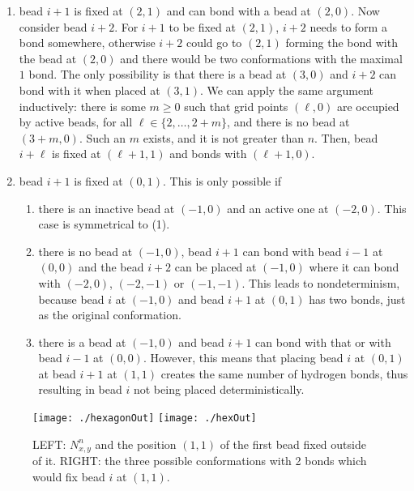 \documentclass[]{llncs}
\begin{document}
\begin{enumerate}
\item bead $i+1$ is fixed at $(2,1)$ and can bond with a bead at $(2,0)$. Now consider bead $i+2$. For $i+1$ to be fixed at $(2,1)$, $i+2$ needs to form a bond somewhere, otherwise $i+2$ could go to $(2,1)$ forming the bond with the bead at $(2,0)$ and there would be two conformations with the maximal $1$ bond. The only possibility is that there is a bead at $(3,0)$ and $i+2$ can bond with it when placed at $(3,1)$. We can apply the same argument inductively: there is some $m\geq 0$ such that grid points $(\ell,0)$ are occupied by active beads, for all $\ell\in \{2,\dots,2+m\}$, and there is no bead at $(3+m,0)$. Such an $m$ exists, and it is not greater than $n$. Then, bead $i+\ell$ is fixed at $(\ell+1,1)$ and bonds with $(\ell+1,0)$. 
\item bead $i+1$ is fixed at $(0,1)$. This is only possible if
\begin{enumerate}
\item there is an inactive bead at $(-1,0)$ and an active one at $(-2,0)$. This case is symmetrical to (1).
\item there is no bead at $(-1,0)$, bead $i+1$ can bond with bead $i-1$ at $(0,0)$ and the bead $i+2$ can be placed at $(-1,0)$ where it can bond with $(-2,0)$, $(-2,-1)$ or $(-1,-1)$. This leads to nondeterminism, because bead $i$ at $(-1,0)$ and bead $i+1$ at $(0,1)$ has two bonds, just as the original conformation.
\item there is a bead at $(-1,0)$ and bead $i+1$ can bond with that or with bead $i-1$ at $(0,0)$. However, this means that placing bead $i$ at $(0,1)$ at bead $i+1$ at $(1,1)$ creates the same number of hydrogen bonds, thus resulting in bead $i$ not being placed deterministically.

\end{enumerate}
\end{enumerate}




\begin{figure}
\centering
\texttt{[image: ./hexagonOut]}
\hspace{10mm} %
\texttt{[image: ./hexOut]}

\caption{LEFT: $N_{x,y}^n$ and the position $(1,1)$ of the first bead fixed outside of it. RIGHT: the three possible conformations with 2 bonds which would fix bead $i$ at $(1,1)$.}
\label{fig:hexagonOut}
\end{figure}
\end{document}
